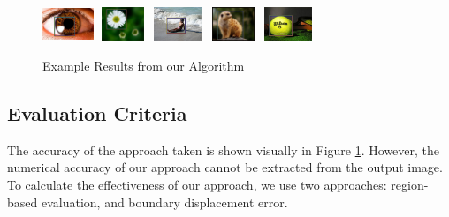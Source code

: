 \documentclass[10pt,twocolumn,letterpaper]{article}
\begin{document}
\begin{figure}[t]
\begin{center}
    \includegraphics[width=0.6in,height=0.4in]{./Figures/boundingbox/5_155_155096RECT.jpg}
    \includegraphics[width=0.6in,height=0.4in]{./Figures/boundingbox/5_155_155145RECT.jpg}
    \includegraphics[width=0.6in,height=0.4in]{./Figures/boundingbox/5_155_155333RECT.jpg}
    \includegraphics[width=0.6in,height=0.4in]{./Figures/boundingbox/5_155_155196RECT.jpg}
    \includegraphics[width=0.6in,height=0.4in]{./Figures/boundingbox/5_155_155459RECT.jpg} \\
    \caption{Example Results from our Algorithm}\label{fig:results}
\end{center}
\end{figure}


\subsection{Evaluation Criteria}
The accuracy of the approach taken is shown visually in Figure \ref{fig:results}.  However, the numerical accuracy of our approach cannot be extracted from the output image.  To calculate the effectiveness of our approach, we use two approaches: region-based evaluation, and boundary displacement error.

\end{document}
